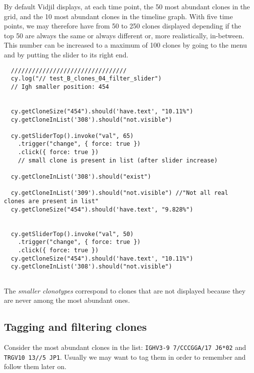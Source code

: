By default Vidjil displays, at each time point, the 50 most abundant clones in the grid, and the 10 most abundant clones in the timeline graph.
With five time points, we may therefore have from 50 to 250 clones displayed
depending if the top 50 are always the same or always different or, more
realistically, in-between.
This number can be increased to a maximum of 100 clones by going to the  menu and by putting the
slider to its right end.

\begin{verbatim}
  /////////////////////////////////
  cy.log("// test_B_clones_04_filter_slider")
  // Igh smaller position: 454


  cy.getCloneSize("454").should('have.text', "10.11%")
  cy.getCloneInList('308').should("not.visible")

  cy.getSliderTop().invoke("val", 65)
    .trigger("change", { force: true })
    .click({ force: true })
    // small clone is present in list (after slider increase)

  cy.getCloneInList('308').should("exist")

  cy.getCloneInList('309').should("not.visible") //"Not all real clones are present in list"
  cy.getCloneSize("454").should('have.text', "9.828%")


  cy.getSliderTop().invoke("val", 50)
    .trigger("change", { force: true })
    .click({ force: true })
  cy.getCloneSize("454").should('have.text', "10.11%")
  cy.getCloneInList('308').should("not.visible")


\end{verbatim}

The \textit{smaller clonotypes} correspond to clones that are not displayed
because they are never among the most abundant ones.


\subsection{Tagging and filtering clones}

Consider the most abundant clones in the list:  \texttt{IGHV3-9 7/CCCGGA/17 J6*02} and  \texttt{TRGV10 13//5 JP1}.
Usually we may want to tag them in order to remember and follow them later on.

